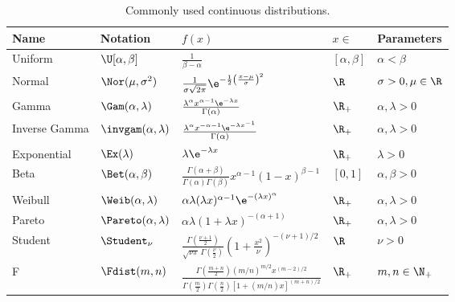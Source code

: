 \begin{table}[H]
	\centering
	\caption{Commonly used continuous distributions.}
	\label{tab:ContinuousDistributions}
	\renewcommand{\arraystretch}{1.5}
	\begin{tabular}{@{}lllll@{}}
		\toprule
		Name          & Notation                   & $f(x)$                                                                                                                & $x \in$           & Parameters               \\
		\midrule
		Uniform       & $\U[\alpha, \beta]$        & $\frac{1}{\beta - \alpha}$                                                                                            & $[\alpha, \beta]$ & $\alpha < \beta$         \\
		Normal        & $\Nor(\mu, \sigma^2)$      & $\frac{1}{\sigma \sqrt{2\pi}} \e^{-\frac{1}{2}\left(\frac{x-\mu}{\sigma}\right)^2}$                                   & $\R$              & $\sigma > 0, \mu \in \R$ \\
		Gamma         & $\Gam(\alpha, \lambda)$    & $\frac{\lambda^\alpha x^{\alpha-1} \e^{-\lambda x}}{\Gamma(\alpha)}$                                                  & $\R_+$            & $\alpha, \lambda > 0$    \\
		Inverse Gamma & $\invgam(\alpha, \lambda)$ & $\frac{\lambda^\alpha x^{-\alpha-1} \e^{-\lambda x^{-1}}}{\Gamma(\alpha)}$                                            & $\R_+$            & $\alpha, \lambda > 0$    \\
		Exponential   & $\Ex(\lambda)$             & $\lambda \e^{-\lambda x}$                                                                                             & $\R_+$            & $\lambda > 0$            \\
		Beta          & $\Bet(\alpha, \beta)$      & $\frac{\Gamma(\alpha + \beta)}{\Gamma(\alpha)\Gamma(\beta)} x^{\alpha-1} (1-x)^{\beta-1}$                             & $[0, 1]$          & $\alpha, \beta > 0$      \\
		Weibull       & $\Weib(\alpha, \lambda)$   & $\alpha\lambda(\lambda x)^{\alpha-1}\e^{-(\lambda x)^\alpha}$                                                         & $\R_+$            & $\alpha, \lambda > 0$    \\
		Pareto        & $\Pareto(\alpha, \lambda)$ & $\alpha\lambda(1 + \lambda x)^{-(\alpha+1)}$                                                                          & $\R_+$            & $\alpha, \lambda > 0$    \\
		Student       & $\Student_\nu$             & $\frac{\Gamma(\frac{\nu+1}{2})}{\sqrt{\nu\pi}\,\Gamma(\frac{\nu}{2})} \left(1 + \frac{x^2}{\nu}\right)^{-(\nu+1)/2}$  & $\R$              & $\nu > 0$                \\
		F             & $\Fdist(m, n)$             & $\frac{\Gamma(\frac{m+n}{2}) (m/n)^{m/2} x^{(m-2)/2}}{\Gamma(\frac{m}{2})\Gamma(\frac{n}{2}) [1 + (m/n)x]^{(m+n)/2}}$ & $\R_+$            & $m, n \in \N_+$          \\
		\bottomrule
	\end{tabular}
\end{table}

